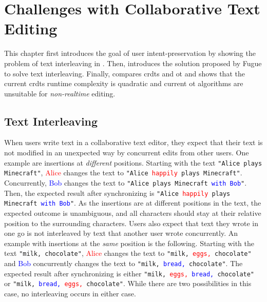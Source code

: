 \chapter{Challenges with Collaborative Text Editing} \label{chapter:challenges}

This chapter first introduces the goal of user intent-preservation by showing the problem of text interleaving in . Then,  introduces the solution proposed by Fugue \cite{2023-weidner-minimizing-interleaving} to solve text interleaving. Finally,  compares \glspl{crdt} and \gls{ot} and shows that the current \glspl{crdt} runtime complexity is quadratic and current \gls{ot} algorithms are unsuitable for \textit{non-realtime} editing.

\section{Text Interleaving} \label{section:challenges-text-interleaving}

When users write text in a collaborative text editor, they expect that their text is not modified in an unexpected way by concurrent edits from other users. One example are insertions at \textit{different} positions. Starting with the text \texttt{"Alice plays Minecraft"}, \textcolor{red}{Alice} changes the text to \texttt{"Alice \textcolor{red}{happily} plays Minecraft"}. Concurrently, \textcolor{blue}{Bob} changes the text to \texttt{"Alice plays Minecraft \textcolor{blue}{with Bob}"}. Then, the expected result after synchronizing is \texttt{"Alice \textcolor{red}{happily} plays Minecraft \textcolor{blue}{with Bob}"}. As the insertions are at different positions in the text, the expected outcome is unambiguous, and all characters should stay at their relative position to the surrounding characters.
Users also expect that text they wrote in one go is not interleaved by text that another user wrote concurrently. An example with insertions at the \textit{same} position is the following. Starting with the text \texttt{"milk, chocolate"}, \textcolor{red}{Alice} changes the text to \texttt{"milk, \textcolor{red}{eggs,} chocolate"} and \textcolor{blue}{Bob} concurrently changes the text to \texttt{"milk, \textcolor{blue}{bread,} chocolate"}. The expected result after synchronizing is either \texttt{"milk, \textcolor{red}{eggs,} \textcolor{blue}{bread,} chocolate"} or \texttt{"milk, \textcolor{blue}{bread,} \textcolor{red}{eggs,} chocolate"}. While there are two possibilities in this case, no interleaving occurs in either case.

